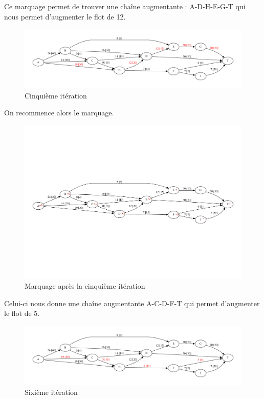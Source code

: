 \documentclass[paper=a4, fontsize=11pt]{scrartcl} %
\numberwithin{equation}{section} %
\numberwithin{figure}{section} %
\numberwithin{table}{section} %
\begin{document}
Ce marquage permet de trouver une chaîne augmentante : A-D-H-E-G-T qui nous permet d'augmenter le flot de 12.

\begin{figure}[h]
\begin{center}
	\includegraphics[width=\textwidth]{figs/reseau-5.pdf}
	\caption{Cinquième itération}
	\label{fig:res:5}
\end{center}
\end{figure}

On recommence alors le marquage. 

\begin{figure}[h]
\begin{center}
	\includegraphics[width=\textwidth]{figs/reseau-5m.pdf}
	\caption{Marquage après la cinquième itération}
	\label{fig:res:5m}
\end{center}
\end{figure}

Celui-ci nous donne une chaîne augmentante A-C-D-F-T qui permet d'augmenter le flot de 5.

\begin{figure}[h]
\begin{center}
	\includegraphics[width=\textwidth]{figs/reseau-6.pdf}
	\caption{Sixième itération}
	\label{fig:res:6}
\end{center}
\end{figure}
\end{document}
